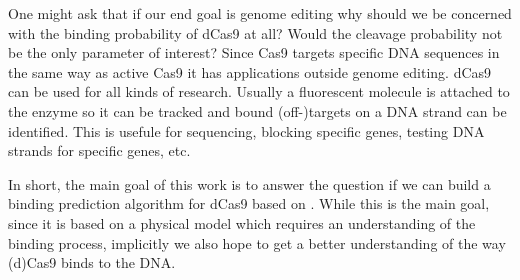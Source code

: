 One might ask that if our end goal is genome editing why should we be concerned with the binding probability of dCas9 at all? Would the cleavage probability not be the only parameter of interest? Since Cas9 targets specific DNA sequences in the same way as active Cas9 it has applications outside genome editing. dCas9 can be used for all kinds of research. Usually a fluorescent molecule is attached to the enzyme so it can be tracked and bound (off-)targets on a DNA strand can be identified. This is usefule for sequencing, blocking specific genes, testing DNA strands for specific genes, etc.

In short, the main goal of this work is to answer the question if we can build a binding prediction algorithm  for dCas9 based on \cite{Misha}. While this is the main goal, since it is based on a physical model which requires an understanding of the binding process, implicitly we also hope to get a better understanding of the way (d)Cas9 binds to the DNA.

